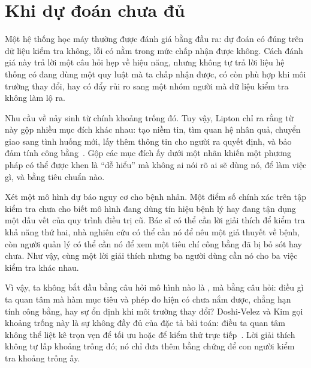 \section{Khi dự đoán chưa đủ}
\label{sec:ch01-khi-du-doan-chua-du}

%
Một hệ thống học máy thường được đánh giá bằng đầu ra: dự đoán có đúng trên
dữ liệu kiểm tra không, lỗi có nằm trong mức chấp nhận được không. Cách đánh
giá này trả lời một câu hỏi hẹp về hiệu năng, nhưng không tự trả lời liệu hệ
thống có đang dùng một quy luật mà ta chấp nhận được, có còn phù hợp khi môi
trường thay đổi, hay có đẩy rủi ro sang một nhóm người mà dữ liệu kiểm tra
không làm lộ ra.

Nhu cầu về  nảy sinh từ chính khoảng
trống đó. Tuy vậy, Lipton chỉ ra rằng từ này gộp nhiều mục đích khác nhau:
tạo niềm tin, tìm quan hệ nhân quả, chuyển giao sang tình huống mới, lấy thêm
thông tin cho người ra quyết định, và bảo đảm tính công bằng~\autocite{p13mythos}.
Gộp các mục đích ấy dưới một nhãn khiến một phương
pháp có thể được khen là \enquote{dễ hiểu} mà không ai nói rõ ai sẽ dùng nó,
để làm việc gì, và bằng tiêu chuẩn nào.

Xét một mô hình dự báo nguy cơ cho bệnh nhân. Một điểm số chính xác trên tập
kiểm tra chưa cho biết mô hình đang dùng tín hiệu bệnh lý hay đang tận dụng
một dấu vết của quy trình điều trị cũ. Bác sĩ có thể cần lời giải thích để
kiểm tra khả năng thứ hai, nhà nghiên cứu có thể cần nó để nêu một giả thuyết
về bệnh, còn người quản lý có thể cần nó để xem một tiêu chí công bằng đã bị
bỏ sót hay chưa. Như vậy, cùng một lời giải thích nhưng ba người dùng cần nó
cho ba việc kiểm tra khác nhau.

%
Vì vậy, ta không bắt đầu bằng câu hỏi mô hình nào là ,
mà bằng câu
hỏi: điều gì ta quan tâm mà hàm mục tiêu và phép đo hiện có chưa nắm được,
chẳng hạn tính công bằng, hay sự ổn định khi môi trường thay đổi? Doshi-Velez
và Kim gọi khoảng trống này là sự không đầy đủ của đặc tả bài toán: điều ta
quan tâm không thể liệt kê trọn vẹn để tối ưu hoặc để kiểm thử trực
tiếp~\autocite{p14rigorous}.
Lời giải thích không tự lấp khoảng trống đó; nó chỉ đưa thêm bằng chứng để
con người kiểm tra khoảng trống ấy.


